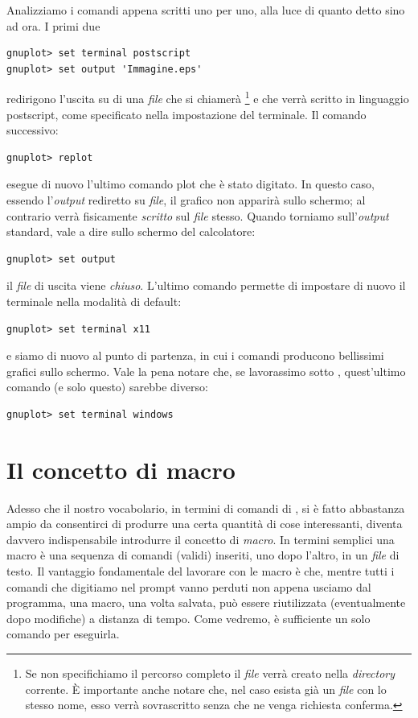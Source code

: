 Analizziamo i comandi appena scritti uno per uno, alla luce di quanto detto
sino ad ora. I primi due
\begin{verbatim}
gnuplot> set terminal postscript
gnuplot> set output 'Immagine.eps'
\end{verbatim}
redirigono l'uscita su di una \emph{file} che si chiamer\`a
%
\footnote{
Se non specifichiamo il percorso completo il \emph{file} verr\`a creato nella
\emph{directory} corrente. \`E importante anche notare che, nel caso esista
gi\`a un \emph{file} con lo stesso nome, esso verr\`a sovrascritto senza che ne
venga richiesta conferma.
}
e che verr\`a scritto in linguaggio postscript, come specificato nella
impostazione del terminale.
Il comando successivo:
\begin{verbatim}
gnuplot> replot
\end{verbatim}
esegue di nuovo l'ultimo comando plot che \`e stato digitato. In questo caso,
essendo l'\emph{output} rediretto su \emph{file}, il grafico non apparir\`a
sullo schermo; al contrario verr\`a fisicamente \emph{scritto} sul \emph{file}
stesso. Quando torniamo sull'\emph{output} standard, vale a dire sullo schermo
del calcolatore:
\begin{verbatim}
gnuplot> set output
\end{verbatim}
il \emph{file} di uscita viene \emph{chiuso}. L'ultimo comando permette di
impostare di nuovo il terminale nella modalit\`a di default:
\begin{verbatim}
gnuplot> set terminal x11
\end{verbatim}
e siamo di nuovo al punto di partenza, in cui i comandi  producono
bellissimi grafici sullo schermo. Vale la pena notare che, se lavorassimo sotto
\windows, quest'ultimo comando (e solo questo) sarebbe diverso:
\begin{verbatim}
gnuplot> set terminal windows
\end{verbatim}


\section{Il concetto di macro}

Adesso che il nostro vocabolario, in termini di comandi di \gnuplot, si \`e
fatto abbastanza ampio da consentirci di produrre una certa quantit\`a di cose
interessanti, diventa davvero indispensabile introdurre il concetto di
\emph{macro}. In termini semplici una macro \`e una sequenza di comandi
(validi) inseriti, uno dopo l'altro, in un \emph{file} di testo.
Il vantaggio fondamentale del lavorare con le macro \`e che, mentre tutti i
comandi che digitiamo nel prompt vanno perduti non appena usciamo dal
programma, una macro, una volta salvata, pu\`o essere riutilizzata
(eventualmente dopo modifiche) a distanza di tempo. Come vedremo, \`e
sufficiente un solo comando per eseguirla.

